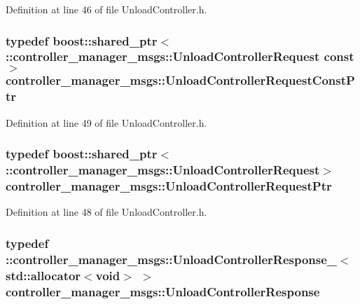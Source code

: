 \-Definition at line 46 of file \-Unload\-Controller.\-h.

\subsubsection[{\-Unload\-Controller\-Request\-Const\-Ptr}]{\setlength{\rightskip}{0pt plus 5cm}typedef boost\-::shared\-\_\-ptr$<$ \-::{\bf controller\-\_\-manager\-\_\-msgs\-::\-Unload\-Controller\-Request} const$>$ {\bf controller\-\_\-manager\-\_\-msgs\-::\-Unload\-Controller\-Request\-Const\-Ptr}}\label{namespacecontroller__manager__msgs_ac6faf789f2520b07a1d280facd4ebc01}


\-Definition at line 49 of file \-Unload\-Controller.\-h.

\subsubsection[{\-Unload\-Controller\-Request\-Ptr}]{\setlength{\rightskip}{0pt plus 5cm}typedef boost\-::shared\-\_\-ptr$<$ \-::{\bf controller\-\_\-manager\-\_\-msgs\-::\-Unload\-Controller\-Request}$>$ {\bf controller\-\_\-manager\-\_\-msgs\-::\-Unload\-Controller\-Request\-Ptr}}\label{namespacecontroller__manager__msgs_ab6bc898513b11e1b0a847eb76a90c343}


\-Definition at line 48 of file \-Unload\-Controller.\-h.

\subsubsection[{\-Unload\-Controller\-Response}]{\setlength{\rightskip}{0pt plus 5cm}typedef \-::{\bf controller\-\_\-manager\-\_\-msgs\-::\-Unload\-Controller\-Response\-\_\-}$<$std\-::allocator$<$void$>$ $>$ {\bf controller\-\_\-manager\-\_\-msgs\-::\-Unload\-Controller\-Response}}\label{namespacecontroller__manager__msgs_a587a7a2f7ae713d8f5910d51152d62b9}


